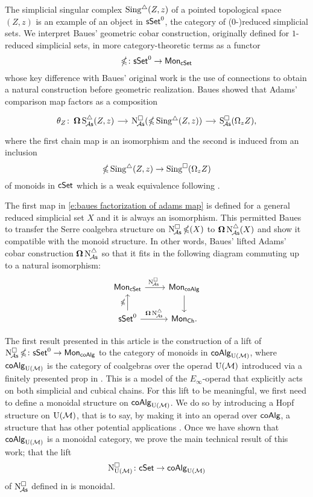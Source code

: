 The simplicial singular complex  $\operatorname{Sing^{\triangle}}(Z,z)$ of a pointed topological space $(Z,z)$ is an example of an object in $\mathsf{sSet}^0$, the category of ($0$-)reduced simplicial sets.
We interpret Baues' geometric cobar construction, originally defined for $1$-reduced simplicial sets, in more category-theoretic terms as a functor
\begin{equation} \label{e:cubical cobar construction}
	\operatorname{\mathbb{\Omega}} \colon \mathsf{sSet}^0 \to \mathsf{Mon}_{\mathsf{cSet}}
\end{equation}
whose key difference with Baues' original work is the use of connections to obtain a natural construction before geometric realization.
Baues showed that Adams' comparison map factors as a composition
\begin{equation} \label{e:baues factorization of adams map}
	\begin{tikzcd}[column sep = small]
		\theta_Z \colon \cobar \sSchainsA(Z,z) \arrow[r] &
		\cchainsA(\ccobar \sSing(Z,z)) \arrow[r] &
		\cSchainsA(\loops_z Z),
	\end{tikzcd}
\end{equation}
where the first chain map is an isomorphism and the second is induced from an inclusion
\[
\operatorname{\mathbb{\Omega}} \operatorname{Sing^{\triangle}}(Z,z) \to \operatorname{Sing^{\square}}(\Omega_z Z)
\]
of monoids in $\mathsf{cSet}$ which is a weak equivalence following \cite{rivera2019path}.

The first map in \eqref{e:baues factorization of adams map} is defined for a general reduced simplicial set $X$ and it is always an isomorphism.
This permitted Baues to transfer the Serre coalgebra structure on $\operatorname{N^{\square}_{\!{\mathcal{A}\mathsf{s}}}} \operatorname{\mathbb{\Omega}}(X)$ to $\operatorname{\mathbf{\Omega}} \operatorname{N^{\triangle}_{\!{\mathcal{A}\mathsf{s}}}}(X)$ and show it compatible with the monoid structure.
In other words, Baues' lifted Adams' cobar construction $\operatorname{\mathbf{\Omega}} \operatorname{N^{\triangle}_{\!{\mathcal{A}\mathsf{s}}}}$ so that it fits in the following diagram commuting up to a natural isomorphism:
\[
\begin{tikzcd}
	\Mon_{\cSet} \arrow[r, "\cchainsA \ "] & \Mon_{\coAlg} \arrow[d] \\
	\sSet^0 \arrow[r, "\cobar \schainsA"] \arrow[u, "\ccobar"] & \Mon_{\Ch}.
\end{tikzcd}
\]

The first result presented in this article is the construction of a lift of $\operatorname{N^{\square}_{\!{\mathcal{A}\mathsf{s}}}} \operatorname{\mathbb{\Omega}} \colon \mathsf{sSet}^0 \to \mathsf{Mon}_{\mathsf{coAlg}}$ to the category of monoids in $\mathsf{coAlg}_{\operatorname{U}(\mathcal{M})}$, where $\mathsf{coAlg}_{\operatorname{U}(\mathcal{M})}$ is the category of coalgebras over the operad ${\operatorname{U}(\mathcal{M})}$ introduced via a finitely presented prop in \cite{medina2020prop1}.
This is a model of the $E_\infty$-operad that explicitly acts on both simplicial and cubical chains.
For this lift to be meaningful, we first need to define a monoidal structure on $\mathsf{coAlg}_{\operatorname{U}(\mathcal{M})}$.
We do so by introducing a Hopf structure on ${\operatorname{U}(\mathcal{M})}$, that is to say, by making it into an operad over $\mathsf{coAlg}$, a structure that has other potential applications \cite{livernet2008hopf}.
Once we have shown that $\mathsf{coAlg}_{\operatorname{U}(\mathcal{M})}$ is a monoidal category, we prove the main technical result of this work; that the lift
\[
\operatorname{N^{\square}_{{\operatorname{U}(\mathcal{M})}}} \colon \mathsf{cSet} \to \mathsf{coAlg}_{\operatorname{U}(\mathcal{M})}
\]
of $\operatorname{N^{\square}_{\!{\mathcal{A}\mathsf{s}}}}$ defined in \cite{medina2022cube_einfty} is monoidal.

